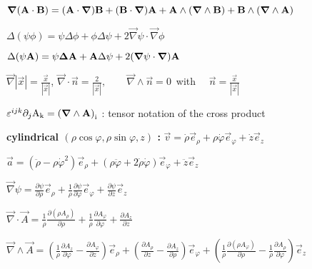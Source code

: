 \item $\vec \nabla (\vec{\rm{A}} \cdot \vec{\rm{B}}) = (\vec{\rm{A}} \cdot \vec \nabla)\vec{\rm{B}} + (\vec{\rm{B}} \cdot \vec \nabla)\vec{\rm{A}} + \vec{\rm{A}} \wedge (\vec \nabla \wedge \vec{\rm{B}}) + \vec{\rm{B}} \wedge (\vec \nabla \wedge \vec{\rm{A}})$

\item $\Delta(\psi\phi) = \psi\Delta\phi + \phi\Delta\psi + 2\vec{\nabla} \psi \cdot \vec{\nabla} \phi$

\item $\Delta(\psi\vec{\rm{A}}) = \psi \vec{\Delta} \vec{\rm{A}} + \vec{\rm{A}}\Delta\psi + 2(\vec{\nabla}\psi \cdot \vec{\nabla})\vec{\rm{A}}$

\item $\vec{\nabla}|\vec{x}| = \frac{\vec{x}}{|\vec{x}|}$, $\vec{\nabla}\cdot\vec{n} = \frac{2}{|\vec{x}|}, \qquad \vec{\nabla} \wedge \vec{n} = 0 \,$ with $\quad \vec{n} = \frac{\vec{x}}{|\vec{x}|}$

\item $\varepsilon^{ijk}\partial_j\rm{A}_k = \left(\vec{\nabla} \wedge \vec{\rm{A}} \right)_i$ : tensor notation of the cross product

\item[] \textbf{cylindrical $(\rho\cos\varphi, \rho\sin\varphi, z)$ : \:}
$\vec{v} = \dot{\rho}\vec{e}_\rho + \rho\dot{\varphi}\vec{e}_\varphi + \dot{z}\vec{e}_z$

\item $\vec{a} = (\ddot{\rho} - \rho\dot{\varphi}^2)\vec{e}_\rho + (\rho\ddot{\varphi} + 2\dot{\rho}\dot{\varphi})\vec{e}_\varphi + \ddot{z}\vec{e}_z$
 
\item $\vec{\nabla}\psi=\frac{\partial \psi}{\partial \rho}\vec{e}_\rho+\frac{1}{\rho}\frac{\partial \psi}{\partial \varphi}\vec{e}_{\varphi}+\frac{\partial \psi}{\partial z}\vec{e}_z$

\item $\vec{\nabla} \cdot \vec{A}=\frac{1}{\rho}\frac{\partial(\rho A_\rho)}{\partial \rho} + \frac{1}{\rho}\frac{\partial A_{\varphi}}{\partial \varphi}+\frac{\partial A_z}{\partial z}$

\item $\vec{\nabla} \wedge \vec{A}=\left(\frac{1}{\rho}\frac{\partial A_z}{\partial\varphi}-\frac{\partial A_{\varphi}}{\partial z}\right)\vec{e}_\rho+\left(\frac{\partial A_\rho}{\partial z}-\frac{\partial A_z}{\partial \rho}\right)\vec{e}_{\varphi}+\left(\frac{1}{\rho}\frac{\partial(\rho A_{\varphi})}{\partial \rho}-\frac{1}{\rho}\frac{\partial A_\rho}{\partial\varphi}\right)\vec{e}_z$

